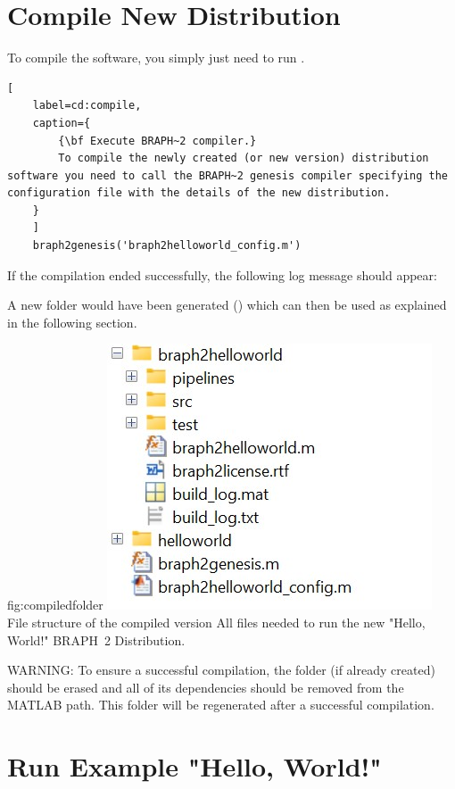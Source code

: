\documentclass{tufte-handout}
\begin{document}
\clearpage
\section{Compile New Distribution}

To compile the software, you simply just need to run .

\begin{lstlisting}[
	label=cd:compile,
	caption={
		{\bf Execute BRAPH~2 compiler.}
		To compile the newly created (or new version) distribution software you need to call the BRAPH~2 genesis compiler specifying the configuration file with the details of the new distribution.
	}
	]
 	braph2genesis('braph2helloworld_config.m')
\end{lstlisting}

If the compilation ended successfully, the following log message should appear:\\


A new  folder would have been generated () which can then be used as explained in the following section.


{fig:compiledfolder}
{\includegraphics{fig02.jpg}}
{File structure of the compiled version}
{
	All files needed to run the new "Hello, World!" BRAPH~2 Distribution.
}



WARNING: To ensure a successful compilation, the folder \newline {} (if already created) should be erased and all of its dependencies should be removed from the MATLAB path. This folder will be regenerated after a successful compilation.

\clearpage
\section{Run Example "Hello, World!"}
\end{document}

